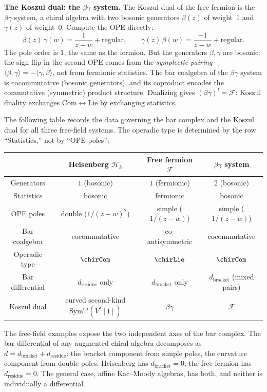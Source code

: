 \medskip
\noindent\textbf{The Koszul dual: the $\beta\gamma$ system.}
The Koszul dual of the free fermion is the $\beta\gamma$ system,
a chiral algebra with two bosonic generators $\beta(z)$ of
weight~$1$ and $\gamma(z)$ of weight~$0$. Compute the OPE
directly:
\begin{equation}\label{eq:frame-betagamma-ope}
\beta(z)\,\gamma(w) = \frac{1}{z-w} + \text{regular},
\qquad
\gamma(z)\,\beta(w) = \frac{-1}{z-w} + \text{regular}.
\end{equation}
The pole order is $1$, the same as the fermion. But the
generators $\beta, \gamma$ are bosonic: the sign flip in the
second OPE comes from the \emph{symplectic pairing}
$\langle \beta, \gamma \rangle = -\langle \gamma, \beta \rangle$,
not from fermionic statistics. The bar coalgebra of the
$\beta\gamma$ system is cocommutative (bosonic generators),
and its coproduct encodes the commutative (symmetric) product
structure. Dualizing gives $(\beta\gamma)^! = \mathcal{F}$:
Koszul duality exchanges
$\mathrm{Com} \leftrightarrow \mathrm{Lie}$
by exchanging statistics.

The following table records the data governing the bar complex
and the Koszul dual for all three free-field systems. The
operadic type is determined by the row ``Statistics,'' not by
``OPE poles'':
\begin{center}
\small
\begin{tabular}{c|c|c|c}
& \textbf{Heisenberg} $\mathcal{H}_k$ &
\textbf{Free fermion} $\mathcal{F}$ &
\textbf{$\beta\gamma$ system} \\
\hline
Generators & $1$ (bosonic) & $1$ (fermionic) & $2$ (bosonic) \\
Statistics & bosonic & fermionic & bosonic \\
OPE poles & double ($1/(z{-}w)^2$) & simple ($1/(z{-}w)$) &
 simple ($1/(z{-}w)$) \\
Bar coalgebra & cocommutative & co-antisymmetric &
 cocommutative \\
Operadic type & $\chirCom$ & $\chirLie$ & $\chirCom$ \\
Bar differential & $d_{\mathrm{residue}}$ only
 & $d_{\mathrm{bracket}}$ only
 & $d_{\mathrm{bracket}}$ (mixed pairs) \\
Koszul dual & curved second-kind $\mathrm{Sym}^{\mathrm{ch}}(V^*[1])$
 & $\beta\gamma$ & $\mathcal{F}$ \\
\end{tabular}
\end{center}

The free-field examples expose the two independent axes of the
bar complex. The bar differential of any augmented chiral
algebra decomposes as
$d = d_{\mathrm{bracket}} + d_{\mathrm{residue}}$: the
bracket component from simple poles, the curvature component
from double poles. Heisenberg has $d_{\mathrm{bracket}} = 0$;
the free fermion has $d_{\mathrm{residue}} = 0$.
The general case, affine Kac--Moody algebras, has both,
and neither is individually a differential.

